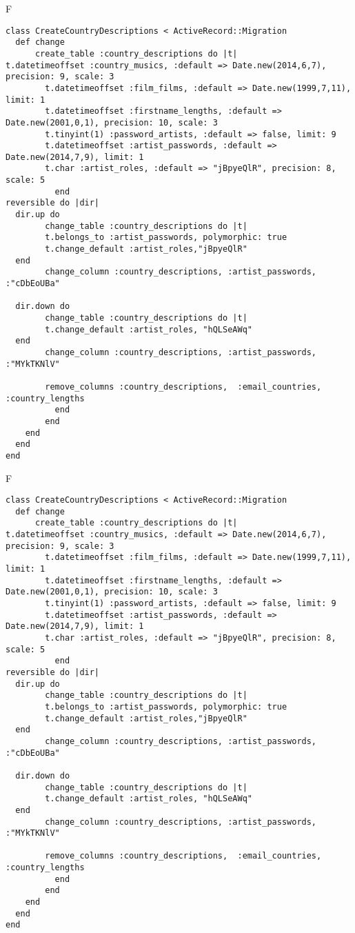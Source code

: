 F
\begin{verbatim}
class CreateCountryDescriptions < ActiveRecord::Migration
  def change
	  create_table :country_descriptions do |t|
t.datetimeoffset :country_musics, :default => Date.new(2014,6,7), precision: 9, scale: 3
		t.datetimeoffset :film_films, :default => Date.new(1999,7,11), limit: 1
		t.datetimeoffset :firstname_lengths, :default => Date.new(2001,0,1), precision: 10, scale: 3
		t.tinyint(1) :password_artists, :default => false, limit: 9
		t.datetimeoffset :artist_passwords, :default => Date.new(2014,7,9), limit: 1
		t.char :artist_roles, :default => "jBpyeQlR", precision: 8, scale: 5
		  end
reversible do |dir|
  dir.up do
		change_table :country_descriptions do |t|
		t.belongs_to :artist_passwords, polymorphic: true
 		t.change_default :artist_roles,"jBpyeQlR"
  end
 		change_column :country_descriptions, :artist_passwords, :"cDbEoUBa"
   
  dir.down do
		change_table :country_descriptions do |t|
		t.change_default :artist_roles, "hQLSeAWq"
  end
 		change_column :country_descriptions, :artist_passwords, :"MYkTKNlV"
   
		remove_columns :country_descriptions,  :email_countries, :country_lengths 
	      end
	    end
    end 
  end
end

\end{verbatim}

F
\begin{verbatim}
class CreateCountryDescriptions < ActiveRecord::Migration
  def change
	  create_table :country_descriptions do |t|
t.datetimeoffset :country_musics, :default => Date.new(2014,6,7), precision: 9, scale: 3
		t.datetimeoffset :film_films, :default => Date.new(1999,7,11), limit: 1
		t.datetimeoffset :firstname_lengths, :default => Date.new(2001,0,1), precision: 10, scale: 3
		t.tinyint(1) :password_artists, :default => false, limit: 9
		t.datetimeoffset :artist_passwords, :default => Date.new(2014,7,9), limit: 1
		t.char :artist_roles, :default => "jBpyeQlR", precision: 8, scale: 5
		  end
reversible do |dir|
  dir.up do
		change_table :country_descriptions do |t|
		t.belongs_to :artist_passwords, polymorphic: true
 		t.change_default :artist_roles,"jBpyeQlR"
  end
 		change_column :country_descriptions, :artist_passwords, :"cDbEoUBa"
   
  dir.down do
		change_table :country_descriptions do |t|
		t.change_default :artist_roles, "hQLSeAWq"
  end
 		change_column :country_descriptions, :artist_passwords, :"MYkTKNlV"
   
		remove_columns :country_descriptions,  :email_countries, :country_lengths 
	      end
	    end
    end 
  end
end

\end{verbatim}

